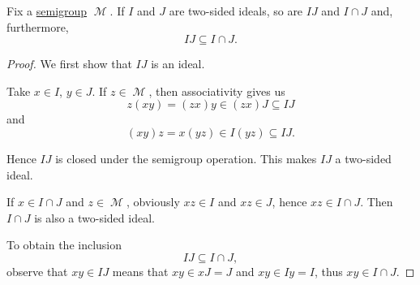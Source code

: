 \begin{proposition}\label{thm:product_of_semigroup_ideals_is_in_intersection}
  Fix a \hyperref[def:magma/associative]{semigroup} \( \mscrM \). If \( I \) and \( J \) are two-sided ideals, so are \( IJ \) and \( I \cap J \) and, furthermore,
  \begin{equation*}
    IJ \subseteq I \cap J.
  \end{equation*}
\end{proposition}
\begin{proof}
  We first show that \( IJ \) is an ideal.

  Take \( x \in I \), \( y \in J \). If \( z \in \mscrM \), then associativity gives us
  \begin{equation*}
    z(xy) = (zx)y \in (zx)J \subseteq IJ
  \end{equation*}
  and
  \begin{equation*}
    (xy)z = x(yz) \in I(yz) \subseteq IJ.
  \end{equation*}

  Hence \( IJ \) is closed under the semigroup operation. This makes \( IJ \) a two-sided ideal.

  If \( x \in I \cap J \) and \( z \in \mscrM \), obviously \( xz \in I \) and \( xz \in J \), hence \( xz \in I \cap J \). Then \( I \cap J \) is also a two-sided ideal.

  To obtain the inclusion
  \begin{equation*}
    IJ \subseteq I \cap J,
  \end{equation*}
  observe that \( xy \in IJ \) means that \( xy \in xJ = J \) and \( xy \in Iy = I \), thus \( xy \in I \cap J \).
\end{proof}
